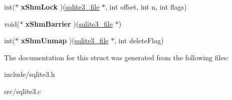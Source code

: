 \begin{DoxyCompactItemize}
\item 
\hypertarget{structsqlite3__io__methods_a58f4a6b0df86440029cc5fa1b65b1b4e}{int($\ast$ {\bfseries x\-Shm\-Lock} )(\hyperlink{structsqlite3__file}{sqlite3\-\_\-file} $\ast$, int offset, int n, int flags)}\label{structsqlite3__io__methods_a58f4a6b0df86440029cc5fa1b65b1b4e}

\item 
\hypertarget{structsqlite3__io__methods_aedf4a59fa25ad33e0625a2aa0f6f2184}{void($\ast$ {\bfseries x\-Shm\-Barrier} )(\hyperlink{structsqlite3__file}{sqlite3\-\_\-file} $\ast$)}\label{structsqlite3__io__methods_aedf4a59fa25ad33e0625a2aa0f6f2184}

\item 
\hypertarget{structsqlite3__io__methods_af69cbc7ece1854576ac262f986871563}{int($\ast$ {\bfseries x\-Shm\-Unmap} )(\hyperlink{structsqlite3__file}{sqlite3\-\_\-file} $\ast$, int delete\-Flag)}\label{structsqlite3__io__methods_af69cbc7ece1854576ac262f986871563}

\end{DoxyCompactItemize}


The documentation for this struct was generated from the following files\-:\begin{DoxyCompactItemize}
\item 
include/sqlite3.\-h\item 
src/sqlite3.\-c\end{DoxyCompactItemize}
